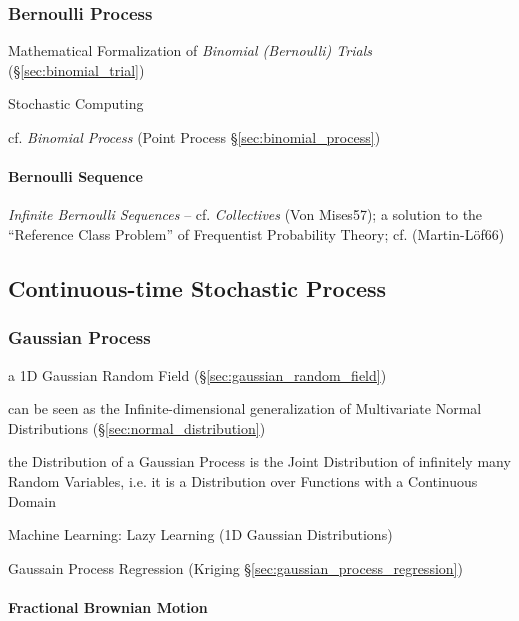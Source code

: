 \subsubsection{Bernoulli Process}\label{sec:bernoulli_process}

Mathematical Formalization of \emph{Binomial (Bernoulli) Trials}
(\S\ref{sec:binomial_trial})

Stochastic Computing

cf. \emph{Binomial Process} (Point Process \S\ref{sec:binomial_process})



\paragraph{Bernoulli Sequence}\label{sec:bernoulli_sequence}\hfill

\emph{Infinite Bernoulli Sequences} -- cf. \emph{Collectives} (Von Mises57); a
solution to the ``Reference Class Problem'' of Frequentist Probability Theory;
cf. (Martin-L\"of66)



\subsection{Continuous-time Stochastic Process}\label{sec:continuous_stochastic}

\subsubsection{Gaussian Process}\label{sec:gaussian_process}

a 1D Gaussian Random Field (\S\ref{sec:gaussian_random_field})

can be seen as the Infinite-dimensional generalization of Multivariate Normal
Distributions (\S\ref{sec:normal_distribution})

the Distribution of a Gaussian Process is the Joint Distribution of infinitely
many Random Variables, i.e. it is a Distribution over Functions with a
Continuous Domain

Machine Learning: Lazy Learning (1D Gaussian Distributions)

Gaussain Process Regression (Kriging \S\ref{sec:gaussian_process_regression})



\paragraph{Fractional Brownian Motion}\label{sec:fractional_brownian}\hfill

